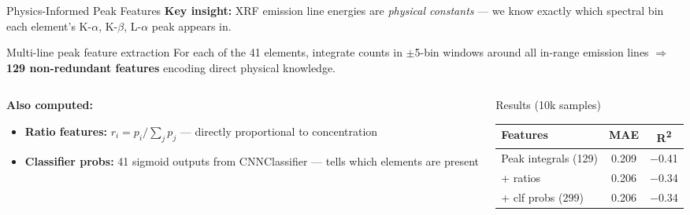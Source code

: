 \begin{frame}{Physics-Informed Peak Features}
    \textbf{Key insight:} XRF emission line energies are \textit{physical constants} — we know exactly which spectral bin each element's K-$\alpha$, K-$\beta$, L-$\alpha$ peak appears in.

    \vspace{0.15cm}
    \begin{block}{Multi-line peak feature extraction}
        For each of the 41 elements, integrate counts in $\pm$5-bin windows around all in-range emission lines $\Rightarrow$ \textbf{129 non-redundant features} encoding direct physical knowledge.
    \end{block}

    \vspace{0.15cm}
    \begin{columns}
        \begin{column}{0.48\textwidth}
            \textbf{Also computed:}
            \begin{itemize}
                \item \textbf{Ratio features:} $r_i = p_i / \sum_j p_j$ — directly proportional to concentration
                \item \textbf{Classifier probs:} 41 sigmoid outputs from CNNClassifier — tells which elements are present
            \end{itemize}
        \end{column}
        \begin{column}{0.48\textwidth}
            \begin{block}{Results (10k samples)}
                \footnotesize
                \begin{tabular}{lcc}
                    \toprule
                    Features & MAE & R\textsuperscript{2} \\
                    \midrule
                    Peak integrals (129)  & 0.209 & $-$0.41 \\
                    + ratios              & 0.206 & $-$0.34 \\
                    + clf probs (299)     & 0.206 & $-$0.34 \\
                    \bottomrule
                \end{tabular}
            \end{block}
        \end{column}
    \end{columns}
\end{frame}


